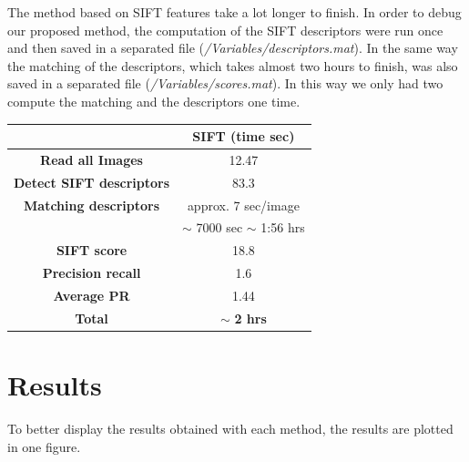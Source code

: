 \documentclass[a4paper,12pt]{article}
\begin{document}
The method based on SIFT features take a lot longer to finish. In order to 
debug our proposed method, the computation of the SIFT descriptors were run once
and then saved in a separated file (\emph{/Variables/descriptors.mat}). In the same
way the matching of the descriptors, which takes almost two hours to finish,
was also saved in a separated file (\emph{/Variables/scores.mat}). In this way
we only had two compute the matching and the descriptors one time. 

\begin{table}[h!]
    \centering
    \begin{tabular}{|c|c|}
        \hline
        & SIFT (time sec) \\
        \hline
        \textbf{Read all Images} & 12.47 \\
        \hline
        \textbf{Detect SIFT descriptors} & 83.3 \\
        \hline
        \textbf{Matching descriptors} & approx. 7 sec/image\\
        & $\sim$ 7000 sec $\sim$ 1:56 hrs\\
        \hline
        \textbf{SIFT score} & 18.8 \\
        \hline
        \textbf{Precision recall} & 1.6 \\
        \hline
        \textbf{Average PR} & 1.44 \\
        \hline
        \textbf{Total} & $\sim$ \textbf{2 hrs}\\
        \hline
    \end{tabular}
    \label{tab:sift}
\end{table}

\section{Results}

To better display the results obtained with each method, the
results are plotted in one figure. 
\end{document}
